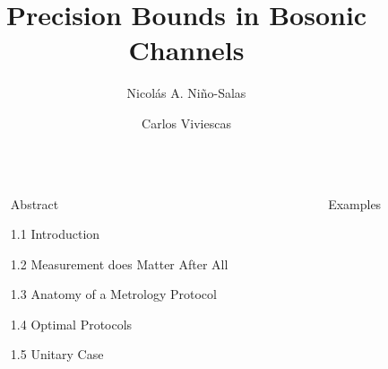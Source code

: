 \documentclass[final]{beamer}
\title{Precision Bounds in Bosonic Channels}
\author{Nicolás A. Niño-Salas \inst{1} \and Carlos Viviescas  \inst{2} }
\institute[shortinst]{Universidad Nacional de Colombia }
\newlength{\sepwidth}
\newlength{\colwidth}
\newcommand{\separatorcolumn}{\begin{column}{\sepwidth}\end{column}}
\begin{document}
\begin{frame}[t]
\begin{columns}[t]
\separatorcolumn

\begin{column}{\colwidth}

  \begin{block}{Abstract}
  \end{block}

  \begin{block}{1.1 Introduction}
  \end{block}

  \begin{block}{1.2 Measurement does Matter After All}
  \end{block}

 \begin{alertblock}{1.3 Anatomy of a Metrology Protocol}
 \end{alertblock}

\begin{block}{1.4 Optimal Protocols}

\end{block}
\begin{block}{1.5 Unitary Case}

\end{block}


\end{column}

\separatorcolumn

\begin{column}{\colwidth}


\begin{block}{Examples}



\end{block}
\end{column}
\end{columns}
\end{frame}
\end{document}
